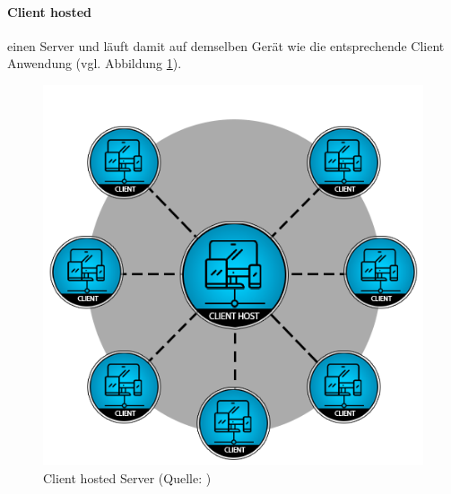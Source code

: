 \paragraph{Client hosted} einen Server und läuft damit auf demselben Gerät wie die entsprechende Client Anwendung (vgl. Abbildung \ref{fig:client_server}).

\begin{figure}[ht]
\centering
\includegraphics[width=1\linewidth]{content/pictures/client-hosted-16be0b1c9b5020f21325b1e6a7beca73.png}
\caption{Client hosted Server (Quelle: \cite{noauthor_network_2024})}
\label{fig:client_server}
\end{figure}



